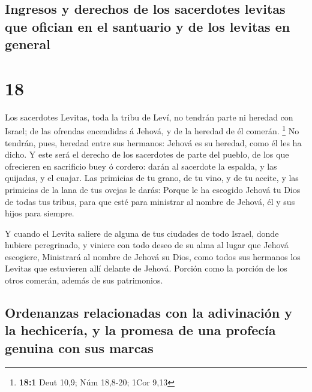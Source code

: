\hypertarget{ingresos-y-derechos-de-los-sacerdotes-levitas-que-ofician-en-el-santuario-y-de-los-levitas-en-general}{%
\subsection{Ingresos y derechos de los sacerdotes levitas que ofician en
el santuario y de los levitas en
general}\label{ingresos-y-derechos-de-los-sacerdotes-levitas-que-ofician-en-el-santuario-y-de-los-levitas-en-general}}

\hypertarget{section-17}{%
\section{18}\label{section-17}}

 Los sacerdotes Levitas, toda la tribu de Leví, no tendrán
parte ni heredad con Israel; de las ofrendas encendidas á Jehová, y de
la heredad de él comerán. \footnote{\textbf{18:1} Deut 10,9; Núm
  18,8-20; 1Cor 9,13}  No tendrán, pues, heredad entre sus
hermanos: Jehová es su heredad, como él les ha dicho.  Y
este será el derecho de los sacerdotes de parte del pueblo, de los que
ofrecieren en sacrificio buey ó cordero: darán al sacerdote la espalda,
y las quijadas, y el cuajar.  Las primicias de tu grano,
de tu vino, y de tu aceite, y las primicias de la lana de tus ovejas le
darás:  Porque le ha escogido Jehová tu Dios de todas tus
tribus, para que esté para ministrar al nombre de Jehová, él y sus hijos
para siempre.

 Y cuando el Levita saliere de alguna de tus ciudades de
todo Israel, donde hubiere peregrinado, y viniere con todo deseo de su
alma al lugar que Jehová escogiere,  Ministrará al nombre
de Jehová su Dios, como todos sus hermanos los Levitas que estuvieren
allí delante de Jehová.  Porción como la porción de los
otros comerán, además de sus patrimonios.

\hypertarget{ordenanzas-relacionadas-con-la-adivinaciuxf3n-y-la-hechiceruxeda-y-la-promesa-de-una-profecuxeda-genuina-con-sus-marcas}{%
\subsection{Ordenanzas relacionadas con la adivinación y la hechicería,
y la promesa de una profecía genuina con sus
marcas}\label{ordenanzas-relacionadas-con-la-adivinaciuxf3n-y-la-hechiceruxeda-y-la-promesa-de-una-profecuxeda-genuina-con-sus-marcas}}

